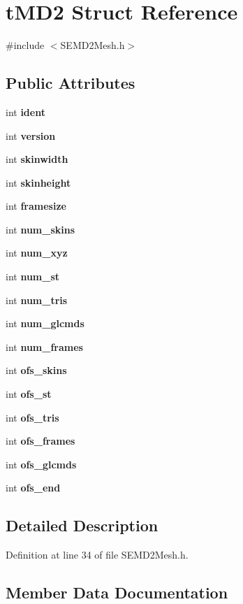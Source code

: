\section{t\+M\+D2 Struct Reference}
\label{structt_m_d2}


{\ttfamily \#include $<$S\+E\+M\+D2\+Mesh.\+h$>$}

\subsection*{Public Attributes}
\begin{DoxyCompactItemize}
\item 
int {\bf ident}
\item 
int {\bf version}
\item 
int {\bf skinwidth}
\item 
int {\bf skinheight}
\item 
int {\bf framesize}
\item 
int {\bf num\+\_\+skins}
\item 
int {\bf num\+\_\+xyz}
\item 
int {\bf num\+\_\+st}
\item 
int {\bf num\+\_\+tris}
\item 
int {\bf num\+\_\+glcmds}
\item 
int {\bf num\+\_\+frames}
\item 
int {\bf ofs\+\_\+skins}
\item 
int {\bf ofs\+\_\+st}
\item 
int {\bf ofs\+\_\+tris}
\item 
int {\bf ofs\+\_\+frames}
\item 
int {\bf ofs\+\_\+glcmds}
\item 
int {\bf ofs\+\_\+end}
\end{DoxyCompactItemize}


\subsection{Detailed Description}


Definition at line 34 of file S\+E\+M\+D2\+Mesh.\+h.



\subsection{Member Data Documentation}
